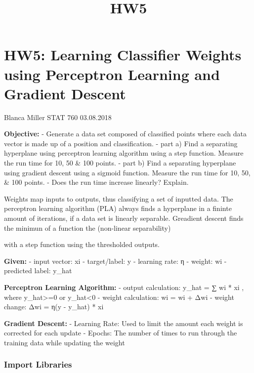 \documentclass[11pt]{article}
\title{HW5}
\begin{document}
    
    
    \maketitle
    
    

    
    \section{HW5: Learning Classifier Weights using Perceptron Learning and
Gradient
Descent}\label{hw5-learning-classifier-weights-using-perceptron-learning-and-gradient-descent}

    Blanca Miller STAT 760 03.08.2018 

    \textbf{Objective:} - Generate a data set composed of classified points
where each data vector is made up of a position and classification. -
part a) Find a separating hyperplane using perceptron learning algorithm
using a step function. Measure the run time for 10, 50 \& 100 points. -
part b) Find a separating hyperplane using gradient descent using a
sigmoid function. Measure the run time for 10, 50, \& 100 points. - Does
the run time increase linearly? Explain.

Weights map inputs to outputs, thus classifying a set of inputted data.
The perceptron learning algorithm (PLA) always finds a hyperplane in a
fininte amount of iterations, if a data set is linearly separable.
Greadient descent finds the minimun of a function the (non-linear
separability)

with a step function using the thresholded outputs.

    \textbf{Given:} - input vector: xi - target/label: y - learning rate: η
- weight: wi - predicted label: y\_hat

\textbf{Perceptron Learning Algorithm:} - output calculation: y\_hat = ∑
wi * xi , where y\_hat\textgreater{}=0 or y\_hat\textless{}0 - weight
calculation: wi = wi + Δwi - weight change: Δwi = η(y - y\_hat) * xi

\textbf{Gradient Descent:} - Learning Rate: Used to limit the amount
each weight is corrected for each update - Epochs: The number of times
to run through the training data while updating the weight

    \subsubsection{Import Libraries}\label{import-libraries}
\end{document}

